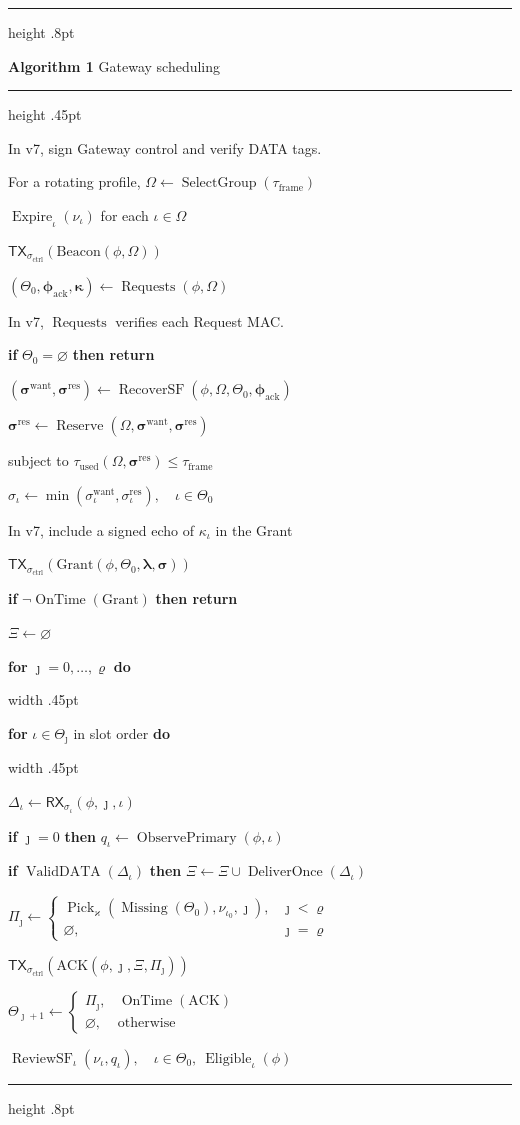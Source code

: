\documentclass[11pt,multi=algorithm,border=6pt]{standalone}
\newenvironment{algorithm}[2]{%
  \begin{minipage}{252pt}
  \raggedright
  \setlength{\parindent}{0pt}%
  \setlength{\parskip}{2pt}%
  \hrule height .8pt\vspace{4pt}%
  {\large\textbf{Algorithm #1} \enspace #2\par}%
  \vspace{3pt}\hrule height .45pt\vspace{5pt}%
}{\par\vspace{5pt}\hrule height .8pt\end{minipage}}
\newcommand{\Step}[1]{\noindent #1\par}
\DeclareMathOperator{\Requests}{Requests}
\DeclareMathOperator{\Reserve}{Reserve}
\DeclareMathOperator{\Deliver}{DeliverOnce}
\DeclareMathOperator{\Missing}{Missing}
\DeclareMathOperator{\Pick}{Pick}
\DeclareMathOperator{\OnTime}{OnTime}
\DeclareMathOperator{\Review}{ReviewSF}
\DeclareMathOperator{\Recover}{RecoverSF}
\DeclareMathOperator{\Eligible}{Eligible}
\DeclareMathOperator{\Expire}{Expire}
\DeclareMathOperator{\ObservePrimary}{ObservePrimary}
\DeclareMathOperator{\Group}{SelectGroup}
\DeclareMathOperator{\ValidDATA}{ValidDATA}
\newcommand{\ctrl}{\sigma_{\mathrm{ctrl}}}
\newcommand{\Tx}[2]{\mathsf{TX}_{#1}(#2)}
\newcommand{\Rx}[2]{\mathsf{RX}_{#1}(#2)}
\newcommand{\Block}[2]{%
  \Step{#1}%
  \noindent\hspace{.75em}\vrule width .45pt\hspace{.65em}%
  \begin{minipage}[t]{\dimexpr\linewidth-1.4em-.45pt\relax}%
    \raggedright\setlength{\parskip}{2pt}#2%
  \end{minipage}\par%
}
\begin{document}
\begin{algorithm}{1}{Gateway scheduling}
  \Step{In v7, sign Gateway control and verify DATA tags.}
  \Step{For a rotating profile, $\Omega\gets\Group(\tau_{\mathrm{frame}})$}
  \Step{$\Expire_\iota(\nu_\iota)$ for each $\iota\in\Omega$}
  \Step{$\Tx{\ctrl}{\mathrm{Beacon}(\phi,\Omega)}$}
  \Step{$(\Theta_0,\boldsymbol{\phi}_{\mathrm{ack}},\boldsymbol{\kappa}) \gets \Requests(\phi,\Omega)$}
  \Step{In v7, $\Requests$ verifies each Request MAC.}
  \Step{\textbf{if} $\Theta_0=\varnothing$ \textbf{then return}}
  \Step{$(\boldsymbol{\sigma}^{\mathrm{want}},\boldsymbol{\sigma}^{\mathrm{res}})
    \gets \Recover(\phi,\Omega,\Theta_0,\boldsymbol{\phi}_{\mathrm{ack}})$}
  \Step{$\boldsymbol{\sigma}^{\mathrm{res}}\gets
    \Reserve(\Omega,\boldsymbol{\sigma}^{\mathrm{want}},\boldsymbol{\sigma}^{\mathrm{res}})$}
  \Step{\hspace{1em}subject to $\tau_{\mathrm{used}}(\Omega,\boldsymbol{\sigma}^{\mathrm{res}})\le\tau_{\mathrm{frame}}$}
  \Step{$\sigma_\iota\gets\min(\sigma_\iota^{\mathrm{want}},\sigma_\iota^{\mathrm{res}}),\quad \iota\in\Theta_0$}
  \Step{In v7, include a signed echo of $\kappa_\iota$ in the Grant}
  \Step{$\Tx{\ctrl}{\mathrm{Grant}(\phi,\Theta_0,\boldsymbol{\lambda},\boldsymbol{\sigma})}$}
  \Step{\textbf{if} $\neg\OnTime(\mathrm{Grant})$ \textbf{then return}}
  \Step{$\Xi\gets\varnothing$}
  \Block{\textbf{for} $\jmath=0,\ldots,\varrho$ \textbf{do}}{%
    \Block{\textbf{for} $\iota\in\Theta_\jmath$ in slot order \textbf{do}}{%
      \Step{$\Delta_\iota\gets\Rx{\sigma_\iota}{\phi,\jmath,\iota}$}
      \Step{\textbf{if} $\jmath=0$ \textbf{then} $q_\iota\gets\ObservePrimary(\phi,\iota)$}
      \Step{\textbf{if} $\ValidDATA(\Delta_\iota)$ \textbf{then} $\Xi\gets\Xi\cup\Deliver(\Delta_\iota)$}%
    }
    \Step{$\Pi_\jmath\gets\begin{cases}
      \Pick_{\varkappa}(\Missing(\Theta_0),\nu_{\iota_0},\jmath), & \jmath<\varrho\\
      \varnothing, & \jmath=\varrho
    \end{cases}$}
    \Step{$\Tx{\ctrl}{\mathrm{ACK}(\phi,\jmath,\Xi,\Pi_\jmath)}$}
    \Step{$\Theta_{\jmath+1}\gets\begin{cases}
      \Pi_\jmath, & \OnTime(\mathrm{ACK})\\
      \varnothing, & \text{otherwise}
    \end{cases}$}%
  }
  \Step{$\Review_\iota(\nu_\iota,q_\iota),\quad \iota\in\Theta_0,\ \Eligible_\iota(\phi)$}
\end{algorithm}
\end{document}
